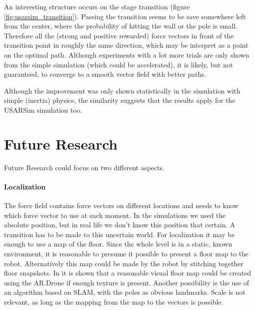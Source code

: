 \documentclass[11pt]{article}
\begin{document}
An interesting structure occurs on the stage transition (figure \ref{fig:usarsim_transition}). Passing the transition seems to be save somewhere left from the center, where the probability of hitting the wall or the pole is small. Therefore all the (strong and positive rewarded) force vectors in front of the transition point in roughly the same direction, which may be interpret as a point on the optimal path. Although experiments with a lot more trials are only shown from the simple simulation (which could be accelerated), it is likely, but not guaranteed, to converge to a smooth vector field with better paths.

Although the improvement was only shown statistically in the simulation with simple (inertia) physics, the similarity suggests that the results apply for the USARSim simulation too.



\section{Future Research}
\label{sec:future}

Future Research could focus on two different aspects.

\paragraph{Localization}

The force field contains force vectors on different locations and needs to know which force vector to use at each moment. In the simulations we used the absolute position, but in real life we don't know this position that certain. A transition has to be made to this uncertain world. For localization it may be enough to use a map of the floor. Since the whole level is in a static, known environment, it is reasonable to presume it possible to present a floor map to the robot. Alternatively this map could be made by the robot by stitching together floor snapshots. In \cite{nick} it is shown that a reasonable visual floor map could be created using the AR.Drone if enough texture is present. Another possibility is the use of an algorithm based on SLAM, with the poles as obvious landmarks. Scale is not relevant, as long as the mapping from the map to the vectors is possible.
\end{document}
